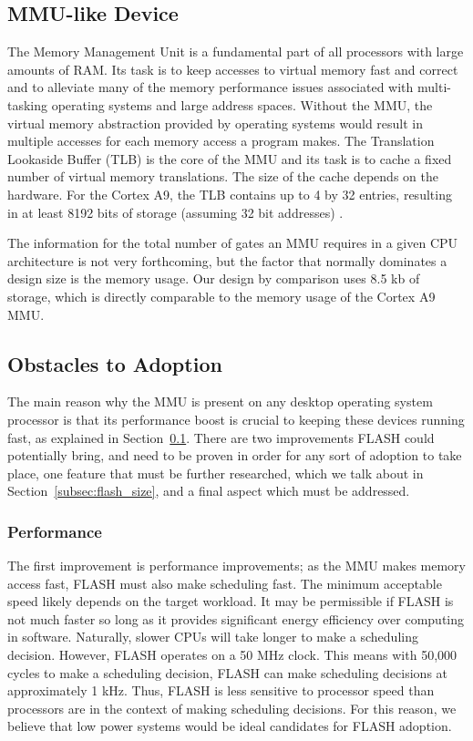 \documentclass{sig-alternate-10pt}
\begin{document}
\subsection{MMU-like Device}
\label{subsec:mmu}
The Memory Management Unit is a fundamental part of all processors with
large amounts of RAM. Its task is to keep accesses to virtual memory fast
and correct and to alleviate many of the memory performance issues
associated with multi-tasking operating systems and large address spaces.
Without the MMU, the virtual memory abstraction provided by operating
systems would result in multiple accesses for each memory access a program
makes. The Translation Lookaside Buffer (TLB) is the core of the MMU and its
task is to cache a fixed number of virtual memory translations. The size of
the cache depends on the hardware. For the Cortex A9, the TLB contains up to
4 by 32 entries, resulting in at least 8192 bits of storage (assuming 32 bit
addresses) \cite{arm_mmu}.

The information for the total number of gates an MMU requires in a given CPU architecture is not very forthcoming, but the factor that normally dominates a design size is the memory usage. Our design by comparison uses 8.5 kb of storage, which is directly comparable to the memory usage of the Cortex A9 MMU.

\subsection{Obstacles to Adoption}
The main reason why the MMU is present on any desktop operating system
processor is that its performance boost is crucial to keeping these devices
running fast, as explained in Section~\ref{subsec:mmu}. There are two
improvements FLASH could potentially bring, and need to be proven in order
for any sort of adoption to take place, one feature that must be further
researched, which we talk about in Section~\ref{subsec:flash_size}, and
a final aspect which must be addressed.

\subsubsection{Performance}
The first improvement is performance improvements; as the MMU makes memory
access fast, FLASH must also make scheduling fast. The
minimum acceptable speed likely depends on the target workload.  It may be
permissible if FLASH is not much faster so long as it provides significant
energy efficiency over computing in software. Naturally, slower CPUs will
take longer to make a scheduling decision.  However, FLASH operates on a 50
MHz clock.  This means with 50,000 cycles to make a scheduling decision,
FLASH can make scheduling decisions at approximately 1 kHz. Thus, FLASH is
less sensitive to processor speed than processors are in the context of
making scheduling decisions. For this reason, we believe that low power
systems would be ideal candidates for FLASH adoption.
\end{document}
